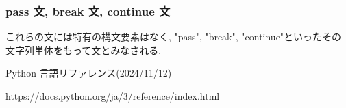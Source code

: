 \documentclass{jlreq}
\begin{document}
            \subsubsection{pass 文, break 文, continue 文}
                これらの文には特有の構文要素はなく, "pass", "break", "continue"といったその文字列単体をもって文とみなされる.
                                
    \begin{thebibliography}{temp}
    Python 言語リファレンス(2024/11/12)
    
    https://docs.python.org/ja/3/reference/index.html
    \end{thebibliography}
\end{document}
